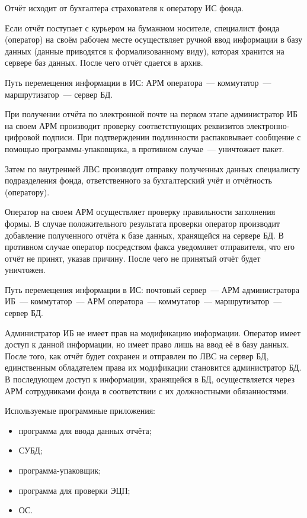 Отчёт исходит от бухгалтера страхователя к оператору ИС фонда.

\point Если отчёт поступает с курьером на бумажном носителе,
специалист фонда (оператор) на своём рабочем месте осуществляет ручной
ввод информации в базу данных (данные приводятся к формализованному
виду), которая хранится на сервере баз данных. После чего отчёт
сдается в архив.

\point Путь перемещения информации в ИС: АРМ оператора~---
коммутатор~--- маршрутизатор~--- сервер БД.

\point При получении отчёта по электронной почте на первом этапе
администратор ИБ на своем АРМ производит проверку соответствующих
реквизитов электронно-цифровой подписи. При подтверждении подлинности
распаковывает сообщение с помощью программы-упаковщика, в противном
случае~--- уничтожает пакет.

Затем по внутренней ЛВС производит отправку полученных данных
специалисту подразделения фонда, ответственного за бухгалтерский учёт
и отчётность (оператору).

Оператор на своем АРМ осуществляет проверку правильности заполнения
формы. В случае положительного результата проверки оператор производит
добавление полученного отчёта к базе данных, хранящейся на сервере БД.
В противном случае оператор посредством факса уведомляет отправителя,
что его отчёт не принят, указав причину. После чего не принятый отчёт
будет уничтожен.

\point Путь перемещения информации в ИС: почтовый сервер~--- АРМ
администратора ИБ~--- коммутатор~--- АРМ оператора~--- коммутатор~---
маршрутизатор~--- сервер БД.

\point Администратор ИБ не имеет прав на модификацию
информации. Оператор имеет доступ к данной информации, но имеет право
лишь на ввод её в базу данных. После того, как отчёт будет сохранен и
отправлен по ЛВС на сервер БД, единственным обладателем права их
модификации становится администратор БД. В последующем доступ к
информации, хранящейся в БД, осуществляется через АРМ сотрудниками
фонда в соответствии с их должностными обязанностями.

\point Используемые программные приложения:

\begin{itemize}
\item программа для ввода данных отчёта;
\item СУБД;
\item программа-упаковщик;
\item программа для проверки ЭЦП;
\item ОС.
\end{itemize}

